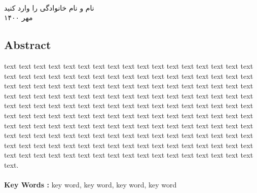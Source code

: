 \documentclass[a4paper,oneside]{book}
\renewcommand{\baselinestretch}{1.5}\normalsize
\begin{document}
	
	\hfill\\
	\begin{flushleft}
		نام و نام خانوادگی را وارد کنید\\
		مهر ۱۴۰۰
	\end{flushleft}
	
	
	
	
	
	
\setcounter{tocdepth}{1}
\tableofcontents
\listoffigures
\newpage



























\appendix



















\renewcommand{\baselinestretch}{2}\normalsize



 \begin{latin}
 	\chapter*{Abstract}	
 	\thispagestyle{empty}
 	\renewcommand{\baselinestretch}{1.5}\normalsize
 	text text text text text text text text text text text text text text text text text text text text text text text text text text text text text text text text text text text text text text text text text text text text text text text text text text text text text text text text text text text text text text text text text text text text text text text text text text text text text text text text text text text text text text text text text text text text text text text text text text text text text text text text text text text text text text text text text text text text text text text text text text text text text text text text text text text text text text text text text text text text text text text text text text text text text text text text text text text text text text text text text text text text text text text text text text text. \\\\
 	\textbf{Key Words :} key word, key word, key word, key word
 \end{latin}
 
\end{document}
